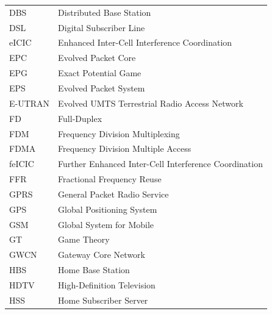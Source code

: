 \begin{tabular}{ll}
DBS & Distributed Base Station\\
DSL & Digital Subscriber Line\\

eICIC & Enhanced Inter-Cell Interference Coordination\\
EPC & Evolved Packet Core\\
EPG & Exact Potential Game\\
EPS & Evolved Packet System\\
E-UTRAN & Evolved UMTS Terrestrial Radio Access Network\\

FD & Full-Duplex\\
FDM & Frequency Division Multiplexing\\
FDMA & Frequency Division Multiple Access\\
feICIC & Further Enhanced Inter-Cell Interference Coordination\\
FFR & Fractional Frequency Reuse\\

GPRS & General Packet Radio Service\\
GPS  & Global Positioning System\\
GSM & Global System for Mobile\\
GT & Game Theory\\
GWCN &Gateway Core Network\\

HBS & Home Base Station\\
HDTV & High-Definition Television\\
HSS & Home Subscriber Server\\


\end{tabular}
